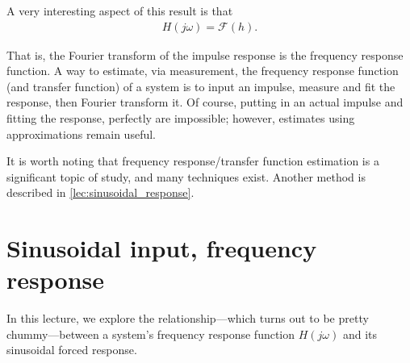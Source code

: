 \documentclass[dynamic_systems.tex]{subfiles}
\begin{document}
A very interesting aspect of this result is that 
\begin{align}
	H(j\omega) = \mathcal{F}(h).
\end{align}

That is, the Fourier transform of the impulse response is the frequency response function.
A way to estimate, via measurement, the frequency response function (and transfer function) of a system is to input an impulse, measure and fit the response, then Fourier transform it.
Of course, putting in an actual impulse and fitting the response, perfectly are impossible; however, estimates using approximations remain useful.
\tags{}

It is worth noting that frequency response/transfer function estimation is a significant topic of study, and many techniques exist.
Another method is described in \cref{lec:sinusoidal_response}.
\tags{}

\section[Sinusoidal frequency response]{Sinusoidal input, frequency response}
\tags{}
\label{lec:sinusoidal_response}

In this lecture, we explore the relationship---which turns out to be pretty chummy---between a system's frequency response function $H(j\omega)$ and its sinusoidal forced response.
\tags{}
\end{document}
